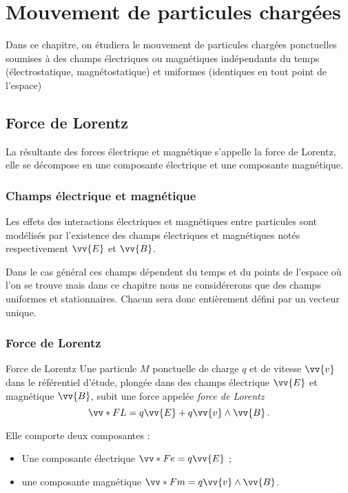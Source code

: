 \documentclass{cours}
\begin{document}
\setcounter{chapter}{12}
\chapter{Mouvement de particules chargées}
Dans ce chapitre, on étudiera le mouvement de particules chargées ponctuelles soumises à des champs électriques ou magnétiques indépendants du temps (électrostatique, magnétostatique) et uniformes (identiques en tout point de l'espace)

\section{Force de Lorentz}%
\label{sec:force_de_lorents}
La résultante des forces électrique et magnétique s'appelle la force de Lorentz, elle se décompose en une composante électrique et une composante magnétique.

\subsection{Champs électrique et magnétique}%
\label{sub:force_electrique}
Les effets des interactions électriques et magnétiques entre particules sont modélisés par l'existence des champs électriques et magnétiques notés respectivement $\vv{E}$ et $\vv{B}$. 

Dans le cas général ces champs dépendent du temps et du points de l'espace où l'on se trouve mais dans ce chapitre nous ne considérerons que des champs uniformes et stationnaires. Chacun sera donc entièrement défini par un vecteur unique.    

\subsection{Force de Lorentz}%
\label{sub:force_de_lorentz}
\begin{loi}{Force de Lorentz}
Une particule $M$ ponctuelle de charge $q$ et de vitesse $\vv{v}$ dans le référentiel d'étude, plongée dans des champs électrique $\vv{E}$ et magnétique $\vv{B}$, subit une force appelée \emph{force de Lorentz} 
\begin{equation}
  \vv*{F}{L} = q\vv{E} + q\vv{v}\wedge\vv{B} \, .
\end{equation}
\end{loi}
% 
Elle comporte deux composantes :
\begin{itemize}
  \item Une composante électrique $\vv*{F}{e} = q \vv{E}$ ;
  \item une composante magnétique $\vv*{F}{m} = q\vv{v}\wedge \vv{B}$. 
\end{itemize}
\end{document}
